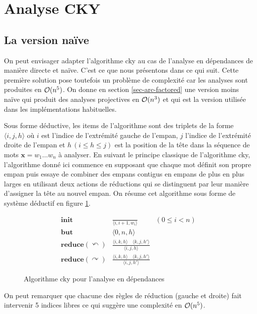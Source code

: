 \documentclass[11pt,openany]{book}
\begin{document}
\section{Analyse CKY}
\subsection{La version naïve}

On peut envisager adapter l'algorithme {\sc cky} au cas de l'analyse
en dépendances de manière directe et naïve. C'est ce que nous
présentons dans ce qui suit. Cette première solution pose toutefois un
problème de complexité car les analyses sont produites en ${\cal O}(n^5)$. On donne en section
\ref{sec-arc-factored} une version moins naïve qui produit des
analyses projectives en ${\cal O}(n^3)$ et qui est la version
utilisée dans les implémentations habituelles.

Sous forme déductive, les items de l'algorithme sont des triplets 
de la forme $\langle i,j,h \rangle$ où $i$ est l'indice de l'extrémité
gauche de l'empan, $j$ l'indice de l'extrémité droite de l'empan et
$h \, (i\leq h \leq j)$ est la position de la tête dans la séquence de
mots $\mathbf{x} = w_1\ldots w_n$ à analyser. 
En suivant le principe classique de l'algorithme {\sc cky}, l'algorithme
donné ici commence en supposant que chaque mot définit son propre empan puis
essaye de combiner des empans contigus en empans de plus en plus
larges en utilisant deux actions de réductions qui se distinguent par
leur manière d'assigner la tête au nouvel empan. On résume cet
algorithme sous forme de système déductif en figure \ref{fig-cky-dep}.
\begin{figure}[htbp]

\begin{eqnarray*}
\mathbf{init}  &\frac{\, }{\langle i, i+1, w_i \rangle} & (0\leq i <
n)\\
\mathbf{but}  &\langle 0,n, h \rangle \\
\mathbf{reduce}(\curvearrowleft) &
\frac{\langle i,k,h \rangle\quad \langle k,j,h' \rangle}
{\langle i,j,h\rangle}\\
\mathbf{reduce}(\curvearrowright) &
\frac{\langle i,k,h \rangle\quad \langle k,j,h' \rangle}
{\langle i,j,h'\rangle} 
\end{eqnarray*}

\caption{\label{fig-cky-dep} Algorithme {\sc cky} pour l'analyse en dépendances}
\end{figure}
On peut remarquer que chacune des règles de réduction (gauche et droite) fait intervenir 5
indices libres ce qui suggère une complexité en ${\cal O}(n^5)$.
\end{document}

